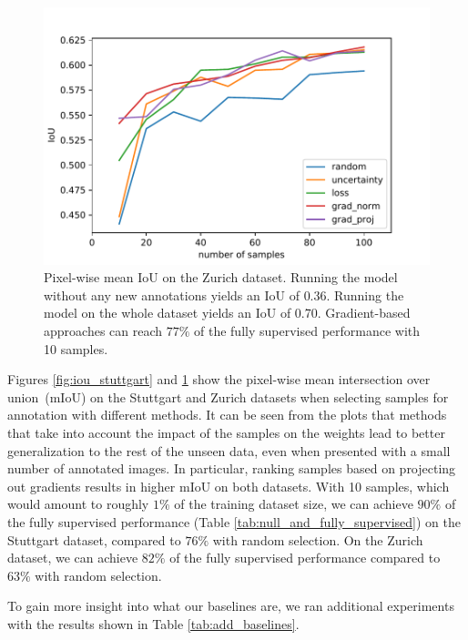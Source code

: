 \documentclass[letterpaper, 10 pt, conference]{ieeeconf}  %
\begin{document}
    \begin{figure}
    \centering
    \includegraphics[width=\linewidth]{pics/pw_iou_zurich.pdf}
   		\caption{Pixel-wise mean IoU on the Zurich dataset. Running the model without any new annotations yields an IoU of $0.36$. Running the model on the whole dataset yields an IoU of 0.70. Gradient-based approaches can reach $77\%$ of the fully supervised performance with 10 samples.}
		\label{fig:iou_zurich}    		
   \end{figure}
   
   
   

Figures \ref{fig:iou_stuttgart} and \ref{fig:iou_zurich} show the pixel-wise mean intersection over union~(mIoU) on the Stuttgart and Zurich datasets when selecting samples for annotation with different methods. It can be seen from the plots that methods that take into account the impact of the samples on the weights lead to better generalization to the rest of the unseen data, even when presented with a small number of annotated images. In particular, ranking samples based on projecting out gradients results in higher mIoU on both datasets. With 10 samples, which would amount to roughly $1\%$ of the training dataset size, we can achieve $90\%$ of the fully supervised performance (Table \ref{tab:null_and_fully_supervised}) on the Stuttgart dataset, compared to $76\%$ with random selection. On the Zurich dataset, we can achieve $82\%$ of the fully supervised performance compared to $63\%$ with random selection.

To gain more insight into what our baselines are, we ran additional experiments with the results shown in Table \ref{tab:add_baselines}. 
\end{document}
